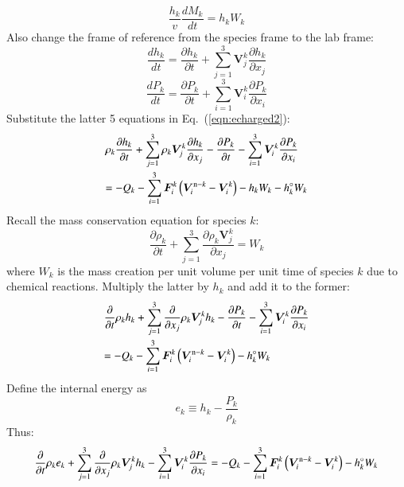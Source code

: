 \documentclass{warpdoc}
\newcommand{\alb}{\vspace{0.1cm}\\} %
\newcommand{\mfd}{\displaystyle}
\renewcommand{\vec}[1]{\bm{#1}}
\begin{document}
%
\begin{equation}
  \frac{h_k}{v}\frac{d M_k}{d t} = h_k W_k
\end{equation}
%
Also change the frame of reference from the species frame to the lab frame:
%
\begin{equation}
\frac{d h_k}{d t} = \frac{\partial h_k}{\partial t} + \sum_{j=1}^3 \vec{V}^k_j \frac{\partial h_k}{\partial x_j}
\end{equation}
%
%
\begin{equation}
\frac{d P_k}{d t} = \frac{\partial P_k}{\partial t} + \sum_{i=1}^3 \vec{V}^k_i \frac{\partial P_k}{\partial x_i}
\end{equation}
%
Substitute the latter 5 equations in Eq.\ (\ref{eqn:echarged2}):
%
\begin{equation}
\begin{array}{l}\mfd
\rho_k \frac{\partial h_k}{\partial t} + \sum_{j=1}^3 \rho_k \vec{V}^k_j \frac{\partial h_k}{\partial x_j} 
- \frac{\partial P_k}{\partial t} - \sum_{i=1}^3 \vec{V}^k_i \frac{\partial P_k}{\partial x_i}
\alb\mfd
= 
-Q_{k}
-\sum_{i=1}^3 \vec{F}_i^k \left( \vec{V}_i^{{\rm n}-k}-\vec{V}_i^k \right)
-h_k W_k - h_k^\circ W_k
\end{array}
\label{eqn:echarged3}
\end{equation}
%  
Recall the mass conservation equation for species $k$:
%
\begin{equation}
\frac{\partial \rho_k}{\partial t}+ \sum_{j=1}^3 \frac{\partial \rho_k \vec{V}^k_j}{\partial x_j}=W_k 
\end{equation}
%
where $W_k$ is the mass creation per unit volume per unit time of species $k$ due to chemical reactions. Multiply the latter by $h_k$ and add it to the former:
%
\begin{equation}
\begin{array}{l}\mfd
 \frac{\partial }{\partial t}\rho_k h_k + \sum_{j=1}^3  \frac{\partial }{\partial x_j} \rho_k \vec{V}^k_j h_k 
- \frac{\partial P_k}{\partial t} - \sum_{i=1}^3 \vec{V}^k_i \frac{\partial P_k}{\partial x_i}
\alb\mfd
= 
-Q_{k}
-\sum_{i=1}^3 \vec{F}_i^k \left( \vec{V}_i^{{\rm n}-k}-\vec{V}_i^k \right)
- h_k^\circ W_k
\end{array}
\end{equation}
%  
Define the internal energy as
%
\begin{equation}
e_k \equiv h_k-\frac{P_k}{\rho_k}
\end{equation}
%
Thus:
%
\begin{equation}
 \frac{\partial }{\partial t}\rho_k e_k + \sum_{j=1}^3  \frac{\partial }{\partial x_j} \rho_k \vec{V}^k_j h_k 
- \sum_{i=1}^3 \vec{V}^k_i \frac{\partial P_k}{\partial x_i}
= 
- Q_{k}
-\sum_{i=1}^3 \vec{F}_i^k \left( \vec{V}_i^{{\rm n}-k}-\vec{V}_i^k \right)
- h_k^\circ W_k
\end{equation}
\end{document}
